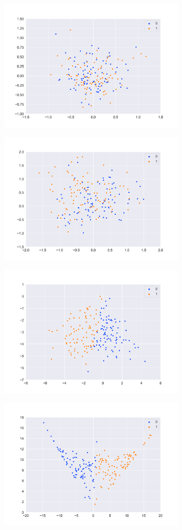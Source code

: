 \begin{figure}[htbp]
    \centering
    \begin{subfigure}
        \centering
        \includegraphics[width=0.45\linewidth]{../images/sst2_feature_map1_pca.png}
    \end{subfigure}
    \begin{subfigure}
        \centering
        \includegraphics[width=0.45\linewidth]{../images/sst2_feature_map2_pca.png}
    \end{subfigure}
    \begin{subfigure}
        \centering
        \includegraphics[width=0.45\linewidth]{../images/sst2_feature_map3_pca.png}
    \end{subfigure}
    \begin{subfigure}
        \centering
        \includegraphics[width=0.45\linewidth]{../images/sst2_feature_map4_pca.png}

\end{subfigure}
\end{figure}

